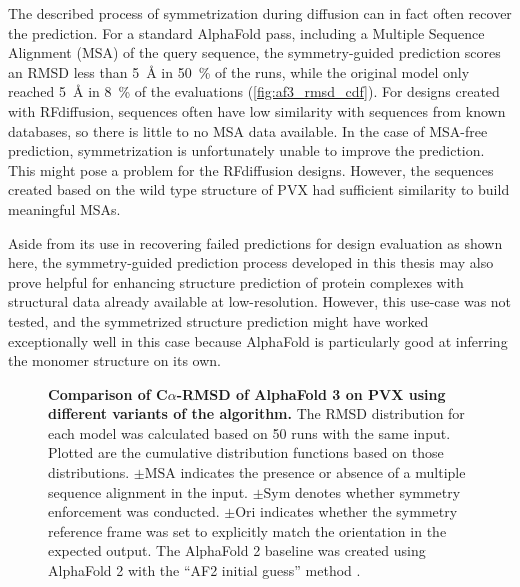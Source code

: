 The described process of symmetrization during diffusion can in fact often recover the prediction. For a standard AlphaFold pass, including a Multiple Sequence Alignment (MSA) of the query sequence, the symmetry-guided prediction scores an RMSD less than \SI{5}{\angstrom} in \SI{50}{\percent} of the runs, while the original model only reached \SI{5}{\angstrom} in \SI{8}{\percent} of the evaluations (\autoref{fig:af3_rmsd_cdf}). For designs created with RFdiffusion, sequences often have low similarity with sequences from known databases, so there is little to no MSA data available. In the case of MSA-free prediction, symmetrization is unfortunately unable to improve the prediction. This might pose a problem for the RFdiffusion designs. However, the sequences created based on the wild type structure of PVX had sufficient similarity to build meaningful MSAs. 

Aside from its use in recovering failed predictions for design evaluation as shown here, the symmetry-guided prediction process developed in this thesis may also prove helpful for enhancing structure prediction of protein complexes with structural data already available at low-resolution. However, this use-case was not tested, and the symmetrized structure prediction might have worked exceptionally well in this case because AlphaFold is particularly good at inferring the monomer structure on its own.

\begin{figure}

\caption{\textbf{Comparison of C$\alpha$-RMSD of AlphaFold 3 on PVX using different variants of the algorithm. } The RMSD distribution for each model was calculated based on 50 runs with the same input. Plotted are the cumulative distribution functions based on those distributions. $\pm\text{MSA}$ indicates the presence or absence of a multiple sequence alignment in the input. $\pm\text{Sym}$ denotes whether symmetry enforcement was conducted. $\pm\text{Ori}$ indicates whether the symmetry reference frame was set to explicitly match the orientation in the expected output. The AlphaFold 2 baseline was created using AlphaFold 2 with the ``AF2 initial guess'' method \cite{binder_design}. } 
\label{fig:af3_rmsd_cdf}
\end{figure}

